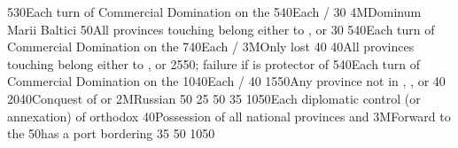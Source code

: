 %
%
%
{5}{30}{Each turn of Commercial Domination on the }%
%
%
{5}{40}{Each \COL/\TP}%
%
%
{}{30}{}%
%
\EUobjective4M{Dominum Marii Baltici}{}%
{}{50}{All provinces touching \regionBaltique belong either to \SUE,
  \paysbrandebourg or \paysdanemark}%
%
%
{}{30}{}%
%
%
%
{5}{40}{Each turn of Commercial Domination on the }%
%
%
{7}{40}{Each \COL/\TP}%
%
\EUobjective3M{Only \provinceNeva lost}{}%
{}{40}{}%
%
%
{}{40}{All provinces touching \regionBaltique belong either to \SUE,
  \paysbrandebourg or \paysdanemark}%
%
%
{25}{50}{; failure if \paysmajeurFrance is protector of \paysPologne}%
%
%
%
{5}{40}{Each turn of Commercial Domination on the }%
%
%
{10}{40}{Each \COL/\TP}%
%
%
{}{40}{}%
%
 {15}{50}{Any province
  not in \regionNorvege, \regionDanemark, \regionFinlande or \regionSuede}%
%
%
{}{40}{}%
%
 
%
%
{20}{40}{Conquest of \payspskov or \paysryazan}%
%
\EUobjective2M{Russian \provinceSmolenska}{}%
{}{50}{}%
%
%
{}{25}{}%
%
%
{}{50}{}%
%
%
{}{35}{}%
%
%
%
{10}{50}{Each diplomatic control (or annexation) of orthodox \MIN}%
%
%
{}{40}{Possession of all national provinces and \provinceSmolenska}%
%
\EUobjective3M{Forward to the \regionBaltique}{}%
{}{50}{\paysmajeurRussie has a port bordering \regionBaltique}%
%
%
{}{35}{}%
%
%
{}{50}{}%
%
%
%
{10}{50}{}%
%
